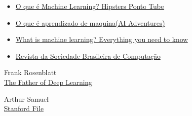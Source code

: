 \documentclass{article}
\begin{document}
    \begin{itemize}
        \item \href{https://www.youtube.com/watch?v=Iuz_jc96bQk}{O que é Machine Learning? Hipsters Ponto Tube}
        \item \href{https://www.youtube.com/watch?v=HcqpanDadyQ}{O que é aprendizado de maquina(AI Adventures)}
        \item \href{https://www.zdnet.com/article/what-is-machine-learning-everything-you-need-to-know/}{What is machine learning? Everything you need to know}
        \item \href{https://www.sbc.org.br/images/flippingbook/computacaobrasil/computa_39/pdf/CompBrasil_39_180.pdf}{Revista da Sociedade Brasileira de Computação}
    \end{itemize}

    \newpage

    \begin{thebibliography}{2}
        Frank Rosenblatt \\
        \href{http://www.csis.pace.edu/~ctappert/srd/b1.pdf}{The Father of Deep Learning} 
        
        Arthur Samuel \\
        \href{https://cs.stanford.edu/memoriam/professor-arthur-samuel}{Stanford  File} 
    \end{thebibliography}
    
\end{document}
